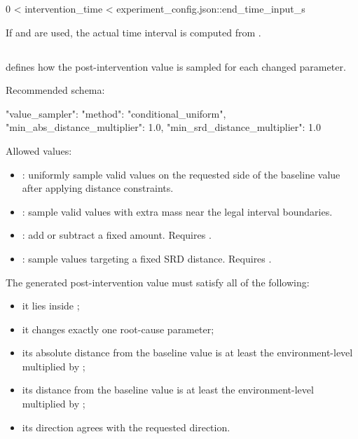 \documentclass[11pt]{article}
\begin{document}
\begin{DocCode}
0 < intervention_time < experiment_config.json::end_time_input_s
\end{DocCode}

If  and  are used, the actual time interval is computed from .

\subsection*{}

 defines how the post-intervention value is sampled for each changed parameter.

Recommended schema:

\begin{DocCode}
"value_sampler": {
  "method": "conditional_uniform",
  "min_abs_distance_multiplier": 1.0,
  "min_srd_distance_multiplier": 1.0
}
\end{DocCode}

Allowed  values:

\begin{itemize}
    \item {}: uniformly sample valid values on the requested side of the baseline value after applying distance constraints.
    \item {}: sample valid values with extra mass near the legal interval boundaries.
    \item {}: add or subtract a fixed amount. Requires .
    \item {}: sample values targeting a fixed SRD distance. Requires .
\end{itemize}

The generated post-intervention value must satisfy all of the following:

\begin{itemize}
    \item it lies inside ;
    \item it changes exactly one root-cause parameter;
    \item its absolute distance from the baseline value is at least the environment-level \termMinAbsDist{} multiplied by ;
    \item its \termSRD{} distance from the baseline value is at least the environment-level \termMinSRDDistance{} multiplied by ;
    \item its direction agrees with the requested direction.
\end{itemize}
\end{document}
